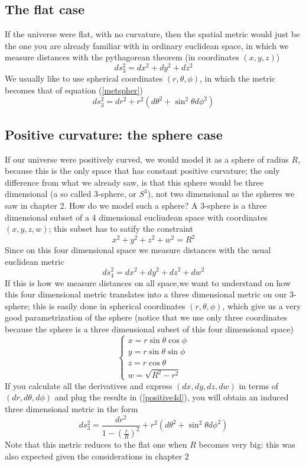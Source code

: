 \documentclass[11pt, a4paper,oneside,openright]{book}
\numberwithin{equation}{section}
\begin{document}
\subsection{The flat case}
If the universe were flat, with no curvature, then the spatial metric would just be the one you are already familiar with in ordinary euclidean space, in which we measure distances with the pythagorean theorem (in coordinates $(x,y,z)$)
\begin{equation}
ds_3^2=dx^2+dy^2+dz^2
\end{equation}
We usually like to use spherical coordinates $(r,\theta,\phi)$, in which the metric becomes that of equation (\ref{metspher})
\begin{equation}
ds_3^2=dr^2+r^2(d\theta^2 + \sin^2{\theta}d\phi^2)
\end{equation}
\subsection{Positive curvature: the sphere case}
If our universe were positively curved, we would model it as a sphere of radius $R$, because this is the only space that has constant positive curvature; the only difference from what we already saw, is that this sphere would be three dimensional (a so called 3-sphere, or $S^3$), not two dimensional as the spheres we saw in chapter 2. How do we model such a sphere? A 3-sphere is a three dimensional subset of a 4 dimensional eucliudean space with coordinates $(x,y,z,w)$; this subset has to satify the constraint
\begin{equation}
x^2+y^2+z^2+w^2=R^2
\end{equation}
Since on this four dimensional space we measure distances with the usual euclidean metric 
\begin{equation}
\label{positive4d}
ds_4^2=dx^2+dy^2+dz^2+dw^2
\end{equation}
If this is how we measure distances on all space,we want to understand on how this four dimensional metric translates into a three dimensional metric on our 3-sphere; this is easily done in spherical coordinates $(r,\theta,\phi)$, which give us a very good parametrization of the sphere (notice that we use only three coordinates because the sphere is a three dimensional subset of this four dimensional space) 
\begin{displaymath}
\left \{ \begin{array}{l}x=r\sin{\theta}\cos{\phi} \\ 
y=r\sin{\theta}\sin{\phi} \\ 
z=r\cos{\theta} \\
w= \sqrt{R^2-r^2} \end{array}  \right.  
\end{displaymath} 
If you calculate all the derivatives and express $(dx,dy,dz,dw)$ in terms of $(dr,d\theta,d\phi)$ and plug the results in (\ref{positive4d}), you will obtain an induced three dimensional metric in the form
\begin{equation}
\label{poscurv}
ds_3^2=\frac{dr^2}{1-\left(\frac{r}{R}\right)^2} + r^2(d\theta^2 + \sin^2{\theta}d\phi^2)
\end{equation}
Note that this metric reduces to the flat one when $R$ becomes very big: this was also expected given the considerations in chapter 2
\end{document}
